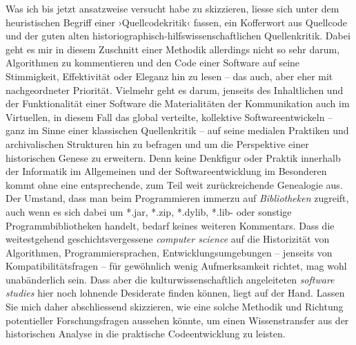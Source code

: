 \documentclass[a4paper,12pt]{article}
\newcommand{\inanf}[1]{›#1‹}
\begin{document}
Was ich bis jetzt ansatzweise versucht habe zu skizzieren, liesse sich unter dem heuristischen Begriff einer \inanf{Quellcodekritik} fassen, ein Kofferwort aus Quellcode und der guten alten historiographisch-hilfswissenschaftlichen Quellenkritik. Dabei geht es mir in diesem Zuschnitt einer Methodik allerdings nicht so sehr darum, Algorithmen zu kommentieren und den Code einer Software auf seine Stimmigkeit, Effektivität oder Eleganz hin zu lesen – das auch, aber eher mit nachgeordneter Priorität. Vielmehr geht es darum, jenseits des Inhaltlichen und der Funktionalität einer Software die Materialitäten der Kommunikation auch im Virtuellen, in diesem Fall das global verteilte, kollektive Softwareentwickeln – ganz im Sinne einer klassischen Quellenkritik – auf seine medialen Praktiken und archivalischen Strukturen hin zu befragen und um die Perspektive einer historischen Genese zu erweitern. Denn keine Denkfigur oder Praktik innerhalb der Informatik im Allgemeinen und der Softwareentwicklung im Besonderen kommt ohne eine entsprechende, zum Teil weit zurückreichende Genealogie aus. Der Umstand, dass man beim Programmieren immerzu auf \emph{Bibliotheken} zugreift, auch wenn es sich dabei um *.jar, *.zip, *.dylib, *.lib- oder sonstige Programmbibliotheken handelt, bedarf keines weiteren Kommentars. Dass die weitestgehend geschichtsvergessene \emph{computer science} auf die Historizität von Algorithmen, Programmiersprachen, Entwicklungsumgebungen – jenseits von Kompatibilitätsfragen – für gewöhnlich wenig Aufmerksamkeit richtet, mag wohl unabänderlich sein. Dass aber die kulturwissenschaftlich angeleiteten \emph{software studies} hier noch lohnende Desiderate finden können, liegt auf der Hand. Lassen Sie mich daher abschliessend skizzieren, wie eine solche Methodik und Richtung potentieller Forschungsfragen aussehen könnte, um einen Wissenstransfer aus der historischen Analyse in die praktische Codeentwicklung zu leisten. 
\end{document}
